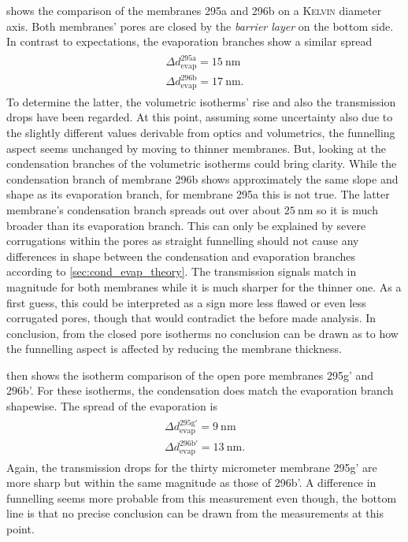 \documentclass[../thesis.tex]{subfiles}
\begin{document}
          

           shows the comparison of the membranes 295a and 296b on a \textsc{Kelvin} diameter axis. Both membranes' pores are closed by the \textit{barrier layer} on the bottom side. In contrast to expectations, the evaporation branches show a similar spread
          \begin{align}
            \begin{split}
              \Delta d_\mathrm{evap}^\mathrm{295a}=\SI{15}{\nano\meter} \\
              \Delta d_\mathrm{evap}^\mathrm{296b}=\SI{17}{\nano\meter}.
            \end{split}
          \end{align}
          To determine the latter, the volumetric isotherms' rise and also the transmission drops have been regarded. At this point, assuming some uncertainty also due to the slightly different values derivable from optics and volumetrics, the funnelling aspect seems unchanged by moving to thinner membranes. But, looking at the condensation branches of the volumetric isotherms could bring clarity. While the condensation branch of membrane 296b shows approximately the same slope and shape as its evaporation branch, for membrane 295a this is not true. The latter membrane's condensation branch spreads out over about $\SI{25}{\nano\meter}$ so it is much broader than its evaporation branch. This can only be explained by severe corrugations within the pores as straight funnelling should not cause any differences in shape between the condensation and evaporation branches according to \cref{sec:cond_evap_theory}. The transmission signals match in magnitude for both membranes while it is much sharper for the thinner one. As a first guess, this could be interpreted as a sign more less flawed or even less corrugated pores, though that would contradict the before made analysis. In conclusion, from the closed pore isotherms no conclusion can be drawn as to how the funnelling aspect is affected by reducing the membrane thickness.

           then shows the isotherm comparison of the open pore membranes 295g' and 296b'. For these isotherms, the condensation does match the evaporation branch shapewise. The spread of the evaporation is
          \begin{align}
            \begin{split}
              \Delta d_\mathrm{evap}^\mathrm{295g'}=\SI{9}{\nano\meter} \\
              \Delta d_\mathrm{evap}^\mathrm{296b'}=\SI{13}{\nano\meter}.
            \end{split}
          \end{align}
          Again, the transmission drops for the thirty micrometer membrane 295g' are more sharp but within the same magnitude as those of 296b'. A difference in funnelling seems more probable from this measurement even though, the bottom line is that no precise conclusion can be drawn from the measurements at this point.
\end{document}
